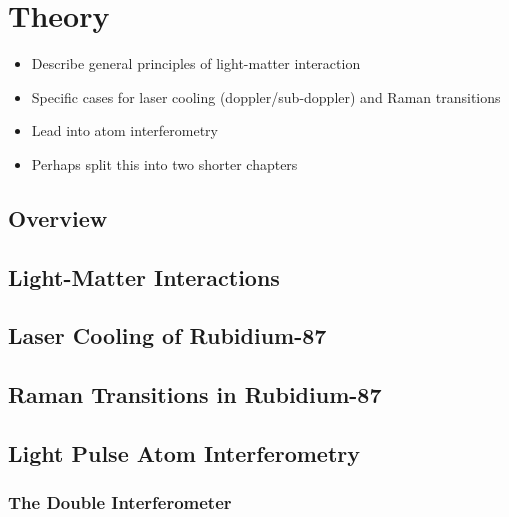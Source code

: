 \chapter{Theory}\label{chap:theory}
\begin{itemize}
    \item Describe general principles of light-matter interaction
    \item Specific cases for laser cooling (doppler/sub-doppler) and Raman transitions 
    \item Lead into atom interferometry
    \item Perhaps split this into two shorter chapters 
\end{itemize}
\section{Overview}\label{sec:theory_overview}
\section{Light-Matter Interactions}\label{sec:theory_lmi}
\section{Laser Cooling of Rubidium-87}
\section{Raman Transitions in Rubidium-87}\label{sec:theory_raman}
\section{Light Pulse Atom Interferometry}\label{sec:theory_atomint}
\subsection{The Double Interferometer}\label{sec:theory_double_int}